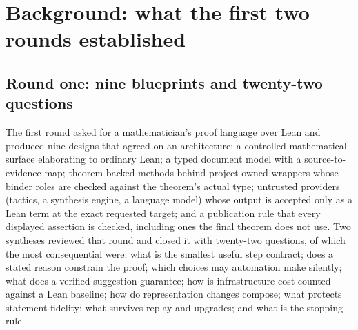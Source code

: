 \documentclass[11pt,a4paper]{article}
\theoremstyle{definition}
\begin{document}
\section{Background: what the first two rounds established}\label{sec:background}

\subsection{Round one: nine blueprints and twenty-two questions}
The first round asked for a mathematician's proof language over Lean and produced nine designs that agreed on an architecture: a controlled mathematical surface elaborating to ordinary Lean; a typed document model with a source-to-evidence map; theorem-backed methods behind project-owned wrappers whose binder roles are checked against the theorem's actual type; untrusted providers (tactics, a synthesis engine, a language model) whose output is accepted only as a Lean term at the exact requested target; and a publication rule that every displayed assertion is checked, including ones the final theorem does not use. Two syntheses reviewed that round and closed it with twenty-two questions, of which the most consequential were: what is the smallest useful step contract; does a stated reason constrain the proof; which choices may automation make silently; what does a verified suggestion guarantee; how is infrastructure cost counted against a Lean baseline; how do representation changes compose; what protects statement fidelity; what survives replay and upgrades; and what is the stopping rule.
\end{document}
